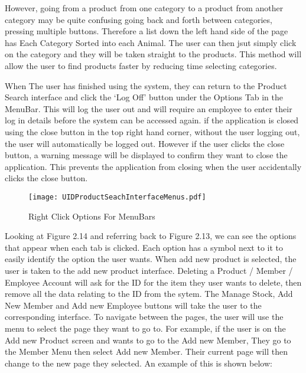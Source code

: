 However, going from a product from one category to a product from another category may be quite confusing going back and forth between categories, pressing multiple buttons. Therefore a list down the left hand side of the page has Each Category Sorted into each Animal. The user can then jsut simply click on the category and they will be taken straight to the products. This method will allow the user to find products faster by reducing time selecting categories. \par

When The user has finished using the system, they can return to the Product Search interface and click the `Log Off' button under the Options Tab in the MenuBar. This will log the user out and will require an employee to enter their log in details before the system can be accessed again. if the application is closed using the close button in the top right hand corner, without the user logging out, the user will automatically be logged out. However if the user clicks the close button, a warning message will be displayed to confirm they want to close the application. This prevents the application from closing when the user accidentally clicks the close button. \par

\begin{figure}[H]
\caption{Right Click Options For MenuBars} \label{fig:Right Click Options For MenuBars}
\hfill\texttt{[image: UIDProductSeachInterfaceMenus.pdf]}\hspace*{\fill}
\end{figure}

Looking at Figure 2.14 and referring back to Figure 2.13, we can see the options that appear when each tab is clicked. Each option has a symbol next to it to easily identify the option the user wants. When add new product is selected, the user is taken to the add new product interface. Deleting a Product / Member / Employee Account will ask for the ID for the item they user wants to delete, then remove all the data relating to the ID from the sytem. The Manage Stock, Add New Member and Add new Employee buttons will take the user to the corresponding interface. To navigate between the pages, the user will use the menu to select the page they want to go to. For example, if the user is on the Add new Product screen and wants to go to the Add new Member, They go to the Member Menu then select Add new Member. Their current page will then change to the new page they selected. An example of this is shown below:\par

